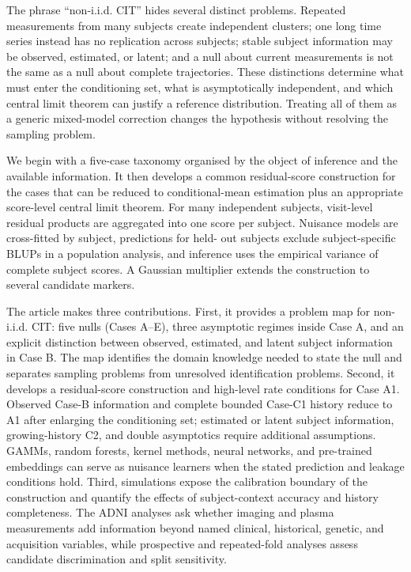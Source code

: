 \documentclass[11pt]{article}
\theoremstyle{definition}
\begin{document}
The phrase ``non-i.i.d. CIT'' hides several distinct problems. Repeated measurements from
many subjects create independent clusters; one long time series instead has no replication
across subjects; stable subject information may be observed, estimated, or latent; and a null
about current measurements is not the same as a null about complete trajectories. These
distinctions determine what must enter the conditioning set, what is asymptotically
independent, and which central limit theorem can justify a reference distribution. Treating
all of them as a generic mixed-model correction changes the hypothesis without resolving the
sampling problem.

We begin with a five-case taxonomy organised by the object of inference and the
available information. It then develops a common residual-score construction for the cases
that can be reduced to conditional-mean estimation plus an appropriate score-level central
limit theorem. For many independent subjects, visit-level residual products are aggregated
into one score per subject. Nuisance models are cross-fitted by subject, predictions for held-
out subjects exclude subject-specific BLUPs in a population analysis, and inference uses the
empirical variance of complete subject scores. A Gaussian multiplier extends the construction
to several candidate markers.

The article makes three contributions. First, it provides a problem map for non-i.i.d. CIT:
five nulls (Cases A--E), three asymptotic regimes inside Case A, and an explicit distinction
between observed, estimated, and latent subject information in Case B. The map identifies the
domain knowledge needed to state the null and separates sampling problems from unresolved
identification problems. Second, it develops a residual-score construction and high-level
rate conditions for Case A1. Observed Case-B information and complete bounded Case-C1 history
reduce to A1 after enlarging the conditioning set; estimated or latent subject information,
growing-history C2, and double asymptotics require additional assumptions. GAMMs, random
forests, kernel methods, neural networks, and pre-trained embeddings can serve as nuisance
learners when the stated prediction and leakage conditions hold. Third, simulations expose
the calibration boundary of the construction and quantify the effects of subject-context
accuracy and history completeness. The ADNI analyses ask whether imaging and plasma
measurements add information beyond named clinical, historical, genetic, and acquisition
variables, while prospective and repeated-fold analyses assess candidate discrimination and
split sensitivity.
\end{document}
